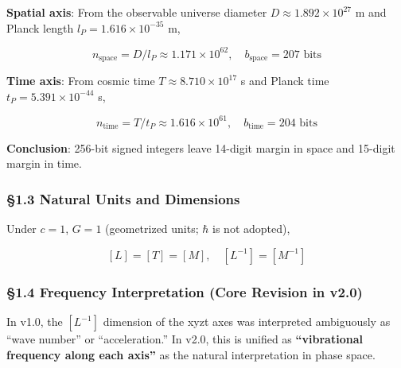 \documentclass[a4paper,11pt]{article}
\begin{document}
\textbf{Spatial axis}: From the observable universe diameter
\(D \approx 1.892 \times 10^{27}\) m and Planck length
\(l_P = 1.616 \times 10^{-35}\) m,

\[n_{\text{space}} = D / l_P \approx 1.171 \times 10^{62}, \quad b_{\text{space}} = 207 \text{ bits}\]

\textbf{Time axis}: From cosmic time \(T \approx 8.710 \times 10^{17}\)
s and Planck time \(t_P = 5.391 \times 10^{-44}\) s,

\[n_{\text{time}} = T / t_P \approx 1.616 \times 10^{61}, \quad b_{\text{time}} = 204 \text{ bits}\]

\textbf{Conclusion}: 256-bit signed integers leave 14-digit margin in
space and 15-digit margin in time.

\subsubsection{§1.3 Natural Units and
Dimensions}\label{natural-units-and-dimensions}

Under \(c = 1\), \(G = 1\) (geometrized units; \(\hbar\) is not
adopted),

\[[L] = [T] = [M], \quad [L^{-1}] = [M^{-1}]\]

\subsubsection{§1.4 Frequency Interpretation (Core Revision in
v2.0)}\label{frequency-interpretation-core-revision-in-v2.0}

In v1.0, the \([L^{-1}]\) dimension of the xyzt axes was interpreted
ambiguously as ``wave number'' or ``acceleration.'' In v2.0, this is
unified as \textbf{``vibrational frequency along each axis''} as the
natural interpretation in phase space.
\end{document}
